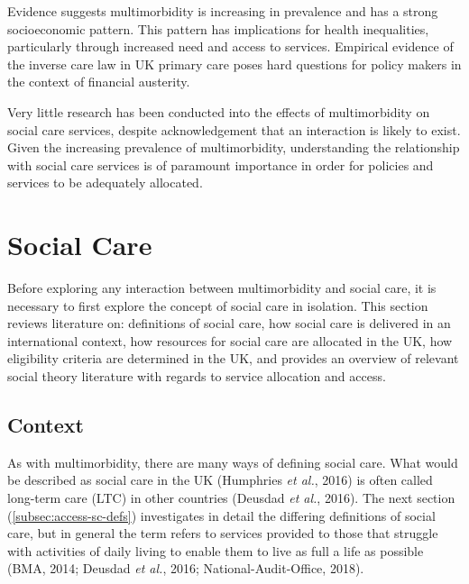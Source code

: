 \documentclass[12pt,a4paper,oneside,table]{report}
\begin{document}
Evidence suggests multimorbidity is increasing in prevalence and has a
strong socioeconomic pattern. This pattern has implications for health
inequalities, particularly through increased need and access to
services. Empirical evidence of the inverse care law in UK primary care
poses hard questions for policy makers in the context of financial
austerity.

Very little research has been conducted into the effects of
multimorbidity on social care services, despite acknowledgement that an
interaction is likely to exist. Given the increasing prevalence of
multimorbidity, understanding the relationship with social care services
is of paramount importance in order for policies and services to be
adequately allocated.

\newpage

\section{Social Care}\label{sec:access-sc}

Before exploring any interaction between multimorbidity and social care,
it is necessary to first explore the concept of social care in
isolation. This section reviews literature on: definitions of social
care, how social care is delivered in an international context, how
resources for social care are allocated in the UK, how eligibility
criteria are determined in the UK, and provides an overview of relevant
social theory literature with regards to service allocation and access.

\subsection{Context}\label{subsec:sc-context}

As with multimorbidity, there are many ways of defining social care.
What would be described as social care in the UK (Humphries \emph{et
al.}, 2016) is often called long-term care (LTC) in other countries
(Deusdad \emph{et al.}, 2016). The next section
(\ref{subsec:access-sc-defs}) investigates in detail the differing
definitions of social care, but in general the term refers to services
provided to those that struggle with activities of daily living to
enable them to live as full a life as possible (BMA, 2014; Deusdad
\emph{et al.}, 2016; National-Audit-Office, 2018).
\end{document}
